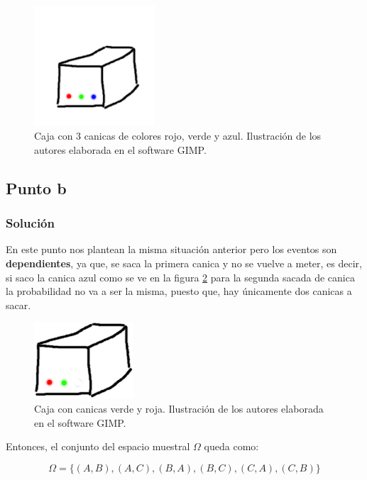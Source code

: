 \documentclass[12pt]{article}
\begin{document}
\begin{figure}[ht]
  \centering
  \includegraphics[width=0.4\textwidth]{img/Caja.png}
  \caption{\label{fig:caja-canica} Caja con 3 canicas de colores rojo, verde y azul. Ilustración de los autores elaborada en el software GIMP.}
\end{figure}


\subsection{Punto b}
\subsubsection{Solución}

En este punto nos plantean la misma situación anterior pero los eventos son \textbf{dependientes}, ya que, se saca la primera canica y no se vuelve a meter, es decir, si saco la canica azul como se ve en la figura \ref{fig:caja-2} para la segunda sacada de canica la probabilidad no va a ser la misma, puesto que, hay únicamente dos canicas a sacar. 

\begin{figure}[ht]
  \centering
  \includegraphics[width=.3\textwidth]{img/Caja2.png}
  \caption{\label{fig:caja-2} Caja con canicas verde y roja. Ilustración de los autores elaborada en el software GIMP.}
\end{figure}


Entonces, el conjunto del espacio muestral \(\Omega\) queda como:

\[
  \Omega = \{ (A, B), (A, C), (B, A), (B, C), (C, A), (C, B)\}
\]
\end{document}
